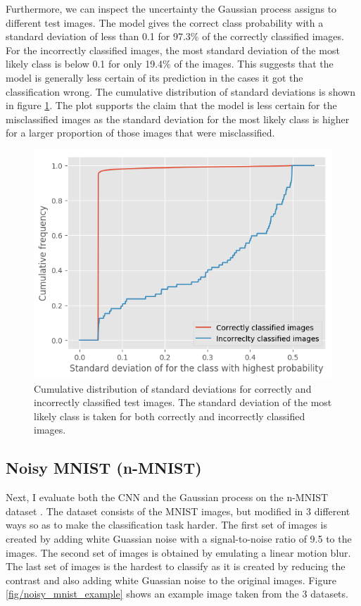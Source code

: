\documentclass{article}
\begin{document}
Furthermore, we can inspect the uncertainty the Gaussian process assigns to different test images. The model gives the correct class probability with a standard deviation of less than 0.1 for 97.3\% of the correctly classified images. For the incorrectly classified images, the most standard deviation of the most likely class is below 0.1 for only 19.4\% of the images. This suggests that the model is generally less certain of its prediction in the cases it got the classification wrong. The cumulative distribution of standard deviations is shown in figure \ref{fig/mnist_cum_stds}. The plot supports the claim that the model is less certain for the misclassified images as the standard deviation for the most likely class is higher for a larger proportion of those images that were misclassified.
\begin{figure}[h]
	\centering
	\includegraphics[scale=0.5]{mnist_cum_stds}
	\caption{Cumulative distribution of standard deviations for correctly and incorrectly classified test images. The standard deviation of the most likely class is taken for both correctly and incorrectly classified images.}
	\label{fig/mnist_cum_stds}
\end{figure}

\subsection{Noisy MNIST (n-MNIST)}
Next, I evaluate both the CNN and the Gaussian process on the n-MNIST dataset \cite{DBLP:journals/corr/BasuKGDMN15}. The dataset consists of the MNIST images, but modified in 3 different ways so as to make the classification task harder. The first set of images is created by adding white Guassian noise with a signal-to-noise ratio of 9.5 to the images. The second set of images is obtained by emulating a linear motion blur. The last set of images is the hardest to classify as it is created by reducing the contrast and also adding white Guassian noise to the original images. Figure \ref{fig/noisy_mnist_example} shows an example image taken from the 3 datasets.
\end{document}
